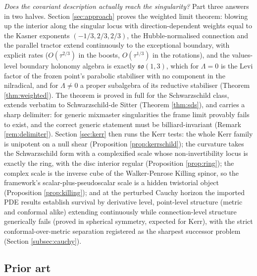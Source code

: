\documentclass[11pt]{article}
\theoremstyle{definition}
\begin{document}
\emph{Does the covariant description actually reach the singularity?} Part three answers in two halves. Section \ref{sec:approach} proves the weighted limit theorem: blowing up the interior along the singular locus with direction-dependent weights equal to the Kasner exponents $(-1/3, 2/3, 2/3)$, the Hubble-normalised connection and the parallel tractor extend continuously to the exceptional boundary, with explicit rates ($O(\tau^{2/3})$ in the boosts, $O(\tau^{1/3})$ in the rotations), and the values-level boundary holonomy algebra is exactly $\mathfrak{so}(1,3)$, which for $\Lambda = 0$ is the Levi factor of the frozen point's parabolic stabiliser with no component in the nilradical, and for $\Lambda \neq 0$ a proper subalgebra of its reductive stabiliser (Theorem \ref{thm:weighted}). The theorem is proved in full for the Schwarzschild class, extends verbatim to Schwarzschild-de Sitter (Theorem \ref{thm:sds}), and carries a sharp delimiter: for generic mixmaster singularities the frame limit provably fails to exist, and the correct generic statement must be billiard-invariant (Remark \ref{rem:delimiter}). Section \ref{sec:kerr} then runs the Kerr tests: the whole Kerr family is unipotent on a null shear (Proposition \ref{prop:kerrschild}); the curvature takes the Schwarzschild form with a complexified scale whose non-invertibility locus is exactly the ring, with the disc interior regular (Proposition \ref{prop:ring}); the complex scale is the inverse cube of the Walker-Penrose Killing spinor, so the framework's scalar-plus-pseudoscalar scale is a hidden twistorial object (Proposition \ref{prop:killing}); and at the perturbed Cauchy horizon the imported PDE results establish survival by derivative level, point-level structure (metric and conformal alike) extending continuously while connection-level structure generically fails (proved in spherical symmetry, expected for Kerr), with the strict conformal-over-metric separation registered as the sharpest successor problem (Section \ref{subsec:cauchy}).

\subsection*{Prior art}
\end{document}
